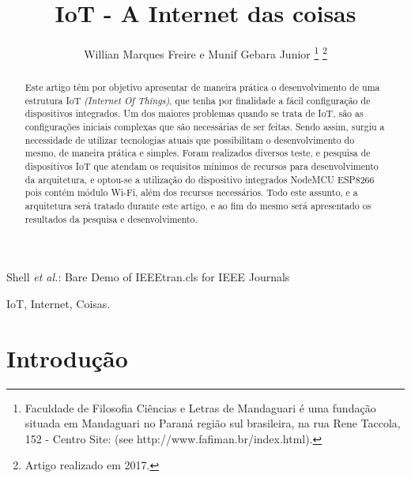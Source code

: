 \documentclass[journal]{IEEEtran}
\begin{document}
\title{IoT - A Internet das coisas}


\author{Willian Marques Freire e
        Munif Gebara Junior%
\thanks{Faculdade de Filosofia Ciências e Letras de Mandaguari é uma fundação
situada em Mandaguari no Paraná região sul brasileira,
na rua Rene Taccola, 152 - Centro Site: (see http://www.fafiman.br/index.html).}%
\thanks{Artigo realizado em 2017.}}



%
{Shell \MakeLowercase{\textit{et al.}}: Bare Demo of IEEEtran.cls for IEEE Journals}

\maketitle

\begin{abstract}
Este artigo têm por objetivo apresentar de maneira prática o desenvolvimento de uma estrutura IoT \emph{(Internet Of Things)}, que tenha por finalidade a fácil configuração de dispositivos integrados. Um dos maiores problemas quando se trata de IoT, são as configurações iniciais complexas que são necessárias de ser feitas. Sendo assim, surgiu a necessidade de utilizar tecnologias atuais que possibilitam o desenvolvimento do mesmo, de maneira prática e simples. Foram realizados diversos teste, e pesquisa de dispositivos IoT que atendam os requisitos mínimos de recursos para desenvolvimento da arquitetura, e optou-se a utilização do dispositivo integrados NodeMCU ESP8266 pois contém módulo Wi-Fi, além dos recursos necessários. Todo este assunto, e a arquitetura será tratado durante este artigo, e ao fim do mesmo será apresentado os resultados da pesquisa e desenvolvimento.
\end{abstract}

\begin{IEEEkeywords}
IoT, Internet, Coisas.
\end{IEEEkeywords}




\IEEEpeerreviewmaketitle



\section{Introdução}
\end{document}
